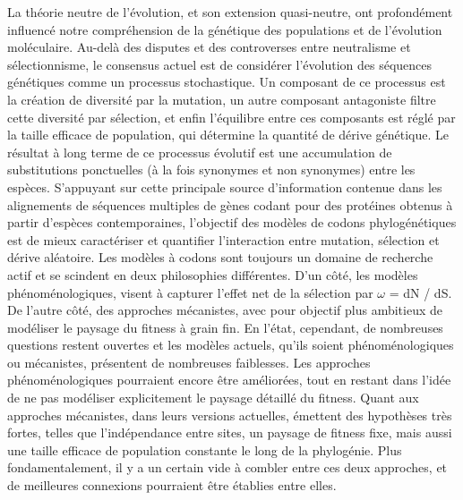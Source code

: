 La théorie neutre de l’évolution, et son extension quasi-neutre, ont profondément influencé notre compréhension de la génétique des populations et de l'évolution moléculaire.
Au-delà des disputes et des controverses entre neutralisme et sélectionnisme, le consensus actuel est de considérer l'évolution des séquences génétiques comme un processus stochastique.
Un composant de ce processus est la création de diversité par la mutation, un autre composant antagoniste filtre cette diversité par sélection, et enfin l'équilibre entre ces composants est réglé par la taille efficace de population, qui détermine la quantité de dérive génétique.
Le résultat à long terme de ce processus évolutif est une accumulation de substitutions ponctuelles (à la fois synonymes et non synonymes) entre les espèces.
S'appuyant sur cette principale source d'information contenue dans les alignements de séquences multiples de gènes codant pour des protéines obtenus à partir d'espèces contemporaines, l'objectif des modèles de codons phylogénétiques est de mieux caractériser et quantifier l'interaction entre mutation, sélection et dérive aléatoire.
Les modèles à codons sont toujours un domaine de recherche actif et se scindent en deux philosophies différentes.
D'un côté, les modèles phénoménologiques, visent à capturer l'effet net de la sélection par $\omega$ = dN / dS.
De l'autre côté, des approches mécanistes, avec pour objectif plus ambitieux de modéliser le paysage du fitness à grain fin.
En l'état, cependant, de nombreuses questions restent ouvertes et les modèles actuels, qu'ils soient phénoménologiques ou mécanistes, présentent de nombreuses faiblesses.
Les approches phénoménologiques pourraient encore être améliorées, tout en restant dans l'idée de ne pas modéliser explicitement le paysage détaillé du fitness.
Quant aux approches mécanistes, dans leurs versions actuelles, émettent des hypothèses très fortes, telles que l'indépendance entre sites, un paysage de fitness fixe, mais aussi une taille efficace de population constante le long de la phylogénie.
Plus fondamentalement, il y a un certain vide à combler entre ces deux approches, et de meilleures connexions pourraient être établies entre elles.

